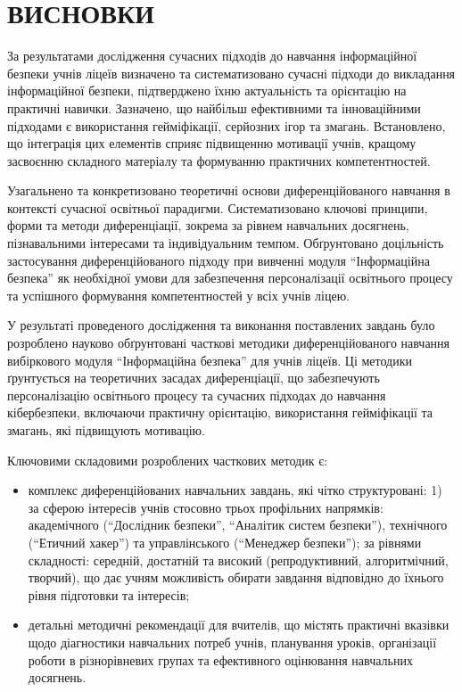 \section*{\centering ВИСНОВКИ}

За результатами дослідження сучасних підходів до навчання інформаційної безпеки учнів ліцеїв визначено та систематизовано сучасні підходи до викладання інформаційної безпеки, підтверджено їхню актуальність та орієнтацію на практичні навички. Зазначено, що найбільш ефективними та інноваційними підходами є використання гейміфікації, серйозних ігор та змагань. Встановлено, що інтеграція цих елементів сприяє підвищенню мотивації учнів, кращому засвоєнню складного матеріалу та формуванню практичних компетентностей.

Узагальнено та конкретизовано теоретичні основи диференційованого навчання в контексті сучасної освітньої парадигми. Систематизовано ключові принципи, форми та методи диференціації, зокрема за рівнем навчальних досягнень, пізнавальними інтересами та індивідуальним темпом. Обґрунтовано доцільність застосування диференційованого підходу при вивченні модуля ``Інформаційна безпека'' як необхідної умови для забезпечення персоналізації освітнього процесу та успішного формування компетентностей у всіх учнів ліцею.

У результаті проведеного дослідження та виконання поставлених завдань було розроблено науково обґрунтовані часткові методики диференційованого навчання вибіркового модуля ``Інформаційна безпека'' для учнів ліцеїв. Ці методики ґрунтується на теоретичних засадах диференціації, що забезпечують персоналізацію освітнього процесу та сучасних підходах до навчання кібербезпеки, включаючи практичну орієнтацію, використання гейміфікації та змагань, які підвищують мотивацію.

Ключовими складовими розроблених часткових методик є:
\begin{itemize}[label=--]
\item комплекс диференційованих навчальних завдань, які чітко структуровані: 1) за сферою інтересів учнів стосовно трьох профільних напрямків: академічного (``Дослідник безпеки'', ``Аналітик систем безпеки''), технічного (``Етичний хакер'') та управлінського (``Менеджер безпеки''); за рівнями складності: середній, достатній та високий (репродуктивний, алгоритмічний, творчий), що дає учням можливість обирати завдання відповідно до їхнього рівня підготовки та інтересів;
\item детальні методичні рекомендації для вчителів, що містять практичні вказівки щодо діагностики навчальних потреб учнів, планування уроків, організації роботи в різнорівневих групах та ефективного оцінювання навчальних досягнень.
\end{itemize}

